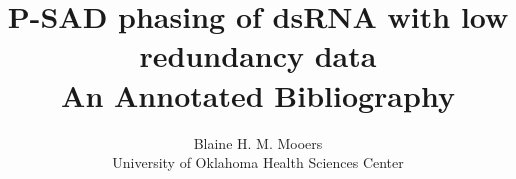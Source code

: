 \documentclass [11pt]{article}
\title{P-SAD phasing of dsRNA with low redundancy data\\\medskip An Annotated Bibliography}
\author{Blaine H. M. Mooers \\University of Oklahoma Health Sciences Center}
\begin{document}
\maketitle
\nocite{*}


\end{document}
